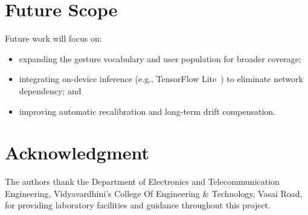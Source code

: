 \documentclass[conference]{IEEEtran}
\newcommand{\InstituteName}{Vidyavardhini's College Of Engineering \& Technology, Vasai Road}
\newcommand{\DeptName}{Department of Electronics and Telecommunication Engineering}
\begin{document}
\section{Future Scope}

Future work will focus on:
\begin{itemize}[noitemsep, topsep=2pt]
  \item expanding the gesture vocabulary and user population for broader coverage;
  \item integrating on-device inference (e.g., TensorFlow Lite~\cite{tensorflow})
        to eliminate network dependency; and
  \item improving automatic recalibration and long-term drift compensation.
\end{itemize}

\section*{Acknowledgment}

The authors thank the \DeptName, \InstituteName, for providing laboratory
facilities and guidance throughout this project.

\balance
\end{document}
